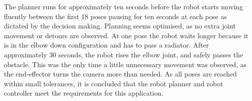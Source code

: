The planner runs for approximately ten seconds before the robot starts moving fluently between the first 18 poses pausing for ten seconds at each pose as dictated by the decision making. Planning seems optimised, as no extra joint movement or detours are observed. At one pose the robot waits longer because it is in the elbow down configuration and has to pass a radiator. After approximately 30 seconds, the robot rises the elbow joint, and safely passes the obstacle. This was the only time a little unnecessary movement was observed, as the end-effector turns the camera more than needed. As all poses are reached within small tolerances, it is concluded that the robot planner and robot controller meet the requirements for this application.